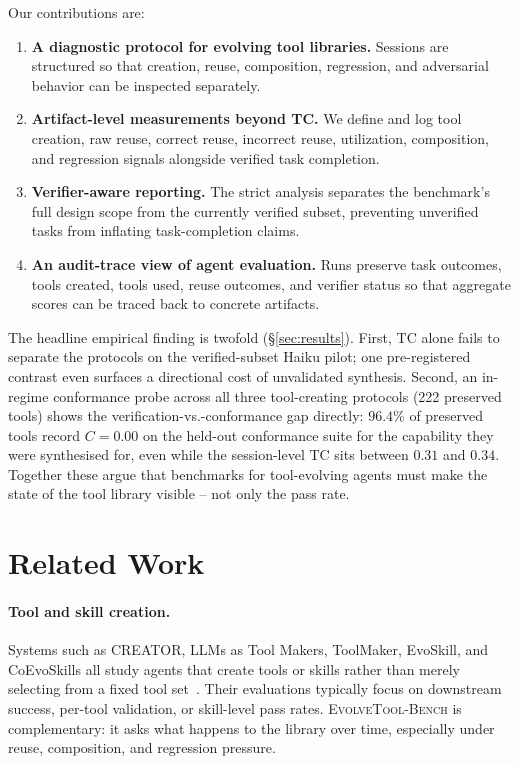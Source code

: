 \documentclass[sigconf,anonymous,review,natbib=false]{acmart}
\begin{document}
Our contributions are:
\begin{enumerate}[leftmargin=1.2em]
  \item \textbf{A diagnostic protocol for evolving tool libraries.} Sessions are structured so that creation, reuse, composition, regression, and adversarial behavior can be inspected separately.
  \item \textbf{Artifact-level measurements beyond TC.} We define and log tool creation, raw reuse, correct reuse, incorrect reuse, utilization, composition, and regression signals alongside verified task completion.
  \item \textbf{Verifier-aware reporting.} The strict analysis separates the benchmark's full design scope from the currently verified subset, preventing unverified tasks from inflating task-completion claims.
  \item \textbf{An audit-trace view of agent evaluation.} Runs preserve task outcomes, tools created, tools used, reuse outcomes, and verifier status so that aggregate scores can be traced back to concrete artifacts.
\end{enumerate}

The headline empirical finding is twofold (\S\ref{sec:results}). First, TC alone fails to separate the protocols on the verified-subset Haiku pilot; one pre-registered contrast even surfaces a directional cost of unvalidated synthesis. Second, an in-regime conformance probe across all three tool-creating protocols (222 preserved tools) shows the verification-vs.-conformance gap directly: $96.4\%$ of preserved tools record $C{=}0.00$ on the held-out conformance suite for the capability they were synthesised for, even while the session-level TC sits between $0.31$ and $0.34$. Together these argue that benchmarks for tool-evolving agents must make the state of the tool library visible -- not only the pass rate.

\section{Related Work}

\paragraph{Tool and skill creation.}
Systems such as CREATOR, LLMs as Tool Makers, ToolMaker, EvoSkill, and CoEvoSkills all study agents that create tools or skills rather than merely selecting from a fixed tool set~\cite{qian2023creator,cai2023latm,wolflein2025toolmaker,alzubi2026evoskill,zhang2026coevoskills}. Their evaluations typically focus on downstream success, per-tool validation, or skill-level pass rates. \textsc{EvolveTool-Bench} is complementary: it asks what happens to the library over time, especially under reuse, composition, and regression pressure.
\end{document}
